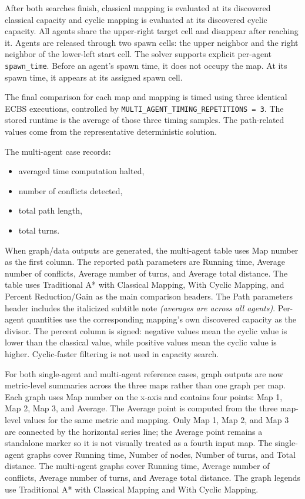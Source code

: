 \documentclass[11pt]{article}
\begin{document}
After both searches finish, classical mapping is evaluated at its discovered classical capacity and cyclic mapping is evaluated at its discovered cyclic capacity. All agents share the upper-right target cell and disappear after reaching it. Agents are released through two spawn cells: the upper neighbor and the right neighbor of the lower-left start cell. The solver supports explicit per-agent \texttt{spawn\_time}. Before an agent's spawn time, it does not occupy the map. At its spawn time, it appears at its assigned spawn cell.

The final comparison for each map and mapping is timed using three identical ECBS executions, controlled by \texttt{MULTI\_AGENT\_TIMING\_REPETITIONS = 3}. The stored runtime is the average of those three timing samples. The path-related values come from the representative deterministic solution.

The multi-agent case records:

\begin{itemize}[leftmargin=2em]
    \item averaged time computation halted,
    \item number of conflicts detected,
    \item total path length,
    \item total turns.
\end{itemize}

When graph/data outputs are generated, the multi-agent table uses Map number as the first column. The reported path parameters are Running time, Average number of conflicts, Average number of turns, and Average total distance. The table uses Traditional A* with Classical Mapping, With Cyclic Mapping, and Percent Reduction/Gain as the main comparison headers. The Path parameters header includes the italicized subtitle note \textit{(averages are across all agents)}. Per-agent quantities use the corresponding mapping's own discovered capacity as the divisor. The percent column is signed: negative values mean the cyclic value is lower than the classical value, while positive values mean the cyclic value is higher. Cyclic-faster filtering is not used in capacity search.

For both single-agent and multi-agent reference cases, graph outputs are now metric-level summaries across the three maps rather than one graph per map. Each graph uses Map number on the x-axis and contains four points: Map 1, Map 2, Map 3, and Average. The Average point is computed from the three map-level values for the same metric and mapping. Only Map 1, Map 2, and Map 3 are connected by the horizontal series line; the Average point remains a standalone marker so it is not visually treated as a fourth input map. The single-agent graphs cover Running time, Number of nodes, Number of turns, and Total distance. The multi-agent graphs cover Running time, Average number of conflicts, Average number of turns, and Average total distance. The graph legends use Traditional A* with Classical Mapping and With Cyclic Mapping.
\end{document}
